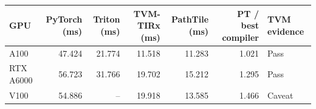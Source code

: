\begin{tabular}{lrrrrrl}
\toprule
GPU & PyTorch (ms) & Triton (ms) & TVM-TIRx (ms) & PathTile (ms) & PT / best compiler & TVM evidence \\
\midrule
A100 & 47.424 & 21.774 & 11.518 & 11.283 & 1.021 & Pass \\
RTX A6000 & 56.723 & 31.766 & 19.702 & 15.212 & 1.295 & Pass \\
V100 & 54.886 & -- & 19.918 & 13.585 & 1.466 & Caveat \\
\bottomrule
\end{tabular}
